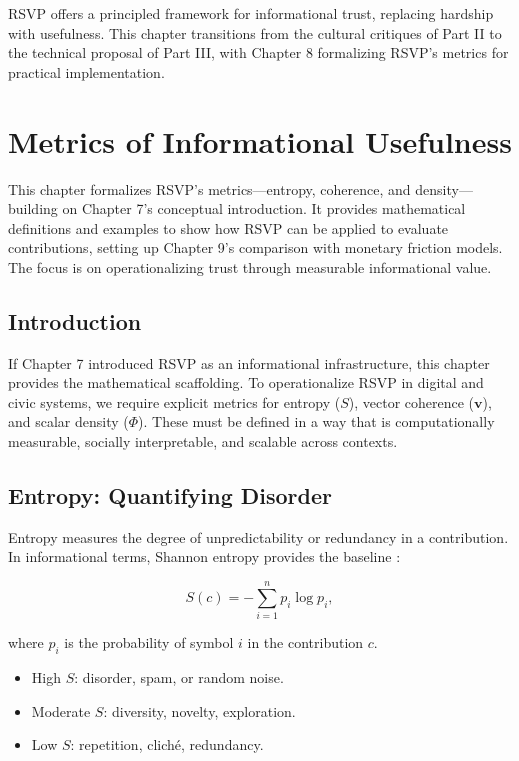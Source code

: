 \documentclass[openany]{book}
\begin{document}
RSVP offers a principled framework for informational trust, replacing hardship with usefulness. This chapter transitions from the cultural critiques of Part II to the technical proposal of Part III, with Chapter 8 formalizing RSVP’s metrics for practical implementation.

\chapter{Metrics of Informational Usefulness}

This chapter formalizes RSVP’s metrics---entropy, coherence, and density---building on Chapter 7’s conceptual introduction. It provides mathematical definitions and examples to show how RSVP can be applied to evaluate contributions, setting up Chapter 9’s comparison with monetary friction models. The focus is on operationalizing trust through measurable informational value.

\section{Introduction}

If Chapter 7 introduced RSVP as an informational infrastructure, this chapter provides the mathematical scaffolding. To operationalize RSVP in digital and civic systems, we require explicit metrics for entropy ($S$), vector coherence ($\mathbf{v}$), and scalar density ($\Phi$). These must be defined in a way that is computationally measurable, socially interpretable, and scalable across contexts.

\section{Entropy: Quantifying Disorder}

Entropy measures the degree of unpredictability or redundancy in a contribution. In informational terms, Shannon entropy provides the baseline \cite{shannon1948}:

\[ S(c) = - \sum_{i=1}^{n} p_i \log p_i, \]

where $p_i$ is the probability of symbol $i$ in the contribution $c$.

\begin{itemize}
    \item High $S$: disorder, spam, or random noise.
    \item Moderate $S$: diversity, novelty, exploration.
    \item Low $S$: repetition, cliché, redundancy.
\end{itemize}
\end{document}

